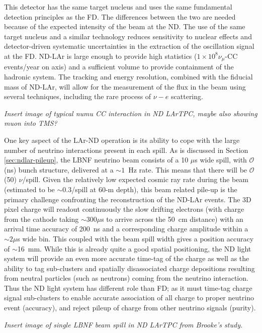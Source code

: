 This detector has the same target nucleus and uses the same fundamental detection principles as the FD. The differences between the two are needed because of the expected intensity of the beam at the ND. The use of the same target nucleus and a similar technology reduces sensitivity to nuclear effects and detector-driven systematic uncertainties in the extraction of the oscillation signal at the FD. ND-LAr is large enough to provide high statistics ($1 \times 10^8 \nu_\mu$-CC events/year on axis) and a sufficient volume to provide containment of the hadronic system. The tracking and energy resolution, combined with the fiducial mass of ND-LAr, will allow for the measurement of the flux in the beam using several techniques, including the rare process of $\nu - e$ scattering. 

{\it Insert image of typical numu CC interaction in ND LArTPC, maybe also showing muon into TMS?}


One key aspect of the LAr-ND operation is its ability to cope with the large number of neutrino interactions present in each spill. As is discussed in Section \ref{sec:ndlar-pileup}, the LBNF neutrino beam consists of a 10 $\mu$s wide spill, with $\mathcal{O}$(ns) bunch structure, delivered at a $\sim 1$~Hz rate. This means that there will be $\mathcal{O}$(50) $\nu$/spill. Given the relatively low expected cosmic ray rate during the beam (estimated to be $\sim$0.3/spill at 60-m depth), this beam related pile-up is the primary challenge confronting the reconstruction of the ND-LAr events. The 3D pixel charge will readout continuously the slow drifting electrons (with charge from the cathode taking $\sim 300 \mu$s to arrive across the 50~cm distance) with an arrival time accuracy of 200~ns and a corresponding charge amplitude within a $\sim 2\mu$s wide bin. This coupled with the beam spill width gives a position accuracy of $\sim$16~mm. While this is already quite a good spatial positioning, the ND light system will provide an even more accurate time-tag of the charge as well as the ability to tag sub-clusters and spatially disassociated charge depositions resulting from neutral particles (such as neutrons) coming from the neutrino interaction. Thus the ND light system has different role than FD; as it must time-tag charge signal sub-clusters to enable accurate association of all charge to proper neutrino event (accuracy), and reject pileup of charge from other neutrino signals (purity).

{\it Insert image of single LBNF beam spill in ND LArTPC from Brooke's study.}
 
